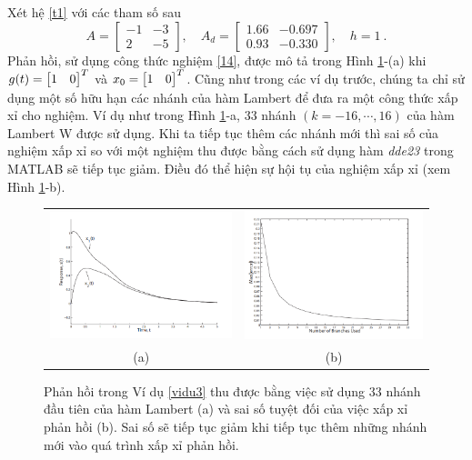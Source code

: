 \begin{vd}\label{vidu3}
Xét hệ \eqref{t1} với các tham số sau
\begin{equation}\label{t19}
A=\begin{bmatrix}
-1 & -3\\
2 & -5
\end{bmatrix},\quad
A_d=\begin{bmatrix}
1.66 & -0.697\\
0.93 & -0.330
\end{bmatrix},\quad h=1 \ .
\end{equation}   
Phản hồi, sử dụng công thức nghiệm \eqref{14}, được mô tả trong Hình \ref{n.hinh1}-(a) khi $g(t)=\begin{bmatrix} 1 & 0 \end{bmatrix}^T$ và $x_0=\begin{bmatrix} 1\quad 0 \end{bmatrix}^T$. Cũng như trong các ví dụ trước, chúng ta chỉ sử dụng một số hữu hạn các nhánh của hàm Lambert để đưa ra một công thức xấp xỉ cho nghiệm. Ví dụ như trong Hình \ref{n.hinh1}-a, 33 nhánh $(k=-16,\cdots,16)$ của hàm Lambert W được sử dụng. 
Khi ta tiếp tục thêm các nhánh mới thì sai số của nghiệm xấp xỉ so với một nghiệm thu được bằng cách sử dụng hàm \textit{dde23} trong MATLAB sẽ tiếp tục giảm. Điều đó thể hiện sự hội tụ của nghiệm xấp xỉ (xem Hình \ref{n.hinh1}-b).

\begin{figure}[h]
	\centering
	\begin{tabular}{cc}
		\includegraphics[width=0.5\linewidth]{hinh/hinh1a} &
		\includegraphics[width=0.5\linewidth]{hinh/hinh1b}\\
		(a) & (b)
	\end{tabular}
	\caption{Phản hồi trong Ví dụ \ref{vidu3} thu được bằng việc sử dụng $33$ nhánh đầu tiên của hàm Lambert (a) và sai số tuyệt đối của việc xấp xỉ phản hồi (b). Sai số sẽ tiếp tục giảm khi tiếp tục thêm những nhánh mới vào quá trình xấp xỉ phản hồi.}
	\label{n.hinh1}	
\end{figure}


\end{vd}
